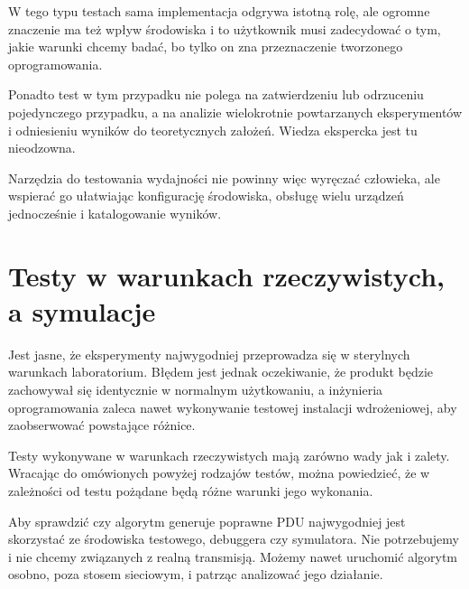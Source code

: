 \documentclass[00-praca-magisterska.tex]{subfiles}
\begin{document}

W tego typu testach sama implementacja odgrywa istotną rolę, ale ogromne
znaczenie ma też wpływ środowiska i to użytkownik musi zadecydować o tym, jakie
warunki chcemy badać, bo tylko on zna przeznaczenie tworzonego oprogramowania.

Ponadto test w tym przypadku nie polega na zatwierdzeniu lub odrzuceniu
pojedynczego przypadku, a na analizie wielokrotnie powtarzanych eksperymentów i
odniesieniu wyników do teoretycznych założeń. Wiedza ekspercka jest tu
nieodzowna.

Narzędzia do testowania wydajności nie powinny więc wyręczać człowieka, ale
wspierać go ułatwiając konfigurację środowiska, obsługę wielu urządzeń
jednocześnie i katalogowanie wyników.

\section{Testy w warunkach rzeczywistych, a symulacje}

Jest jasne, że eksperymenty najwygodniej przeprowadza się w sterylnych
warunkach laboratorium. Błędem jest jednak oczekiwanie, że produkt będzie
zachowywał się identycznie w normalnym użytkowaniu, a inżynieria oprogramowania
zaleca nawet wykonywanie testowej instalacji wdrożeniowej, aby zaobserwować
powstające różnice.

Testy wykonywane w warunkach rzeczywistych mają zarówno wady jak i zalety.
Wracając do omówionych powyżej rodzajów testów, można powiedzieć, że w
zależności od testu pożądane będą różne warunki jego wykonania.

Aby sprawdzić czy algorytm generuje poprawne PDU najwygodniej jest skorzystać
ze środowiska testowego, debuggera czy symulatora. Nie potrzebujemy i nie
chcemy  związanych z realną transmisją. Możemy nawet uruchomić algorytm
osobno, poza stosem sieciowym, i patrząc  analizować jego działanie.
\end{document}
